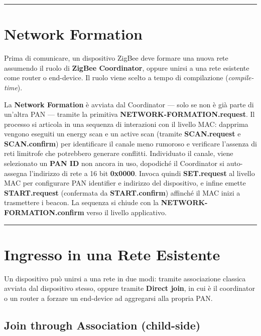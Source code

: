 \documentclass[
  italian,
  openany]{book}
\begin{document}
\begin{center}\rule{0.5\linewidth}{0.5pt}\end{center}

\section{Network Formation}\label{network-formation}

Prima di comunicare, un dispositivo ZigBee deve formare una nuova rete
assumendo il ruolo di \textbf{ZigBee Coordinator}, oppure unirsi a una
rete esistente come router o end-device. Il ruolo viene scelto a tempo
di compilazione (\emph{compile-time}).

La \textbf{Network Formation} è avviata dal Coordinator --- solo se non
è già parte di un'altra PAN --- tramite la primitiva
\textbf{NETWORK-FORMATION.request}. Il processo si articola in una
sequenza di interazioni con il livello MAC: dapprima vengono eseguiti un
energy scan e un active scan (tramite \textbf{SCAN.request} e
\textbf{SCAN.confirm}) per identificare il canale meno rumoroso e
verificare l'assenza di reti limitrofe che potrebbero generare
conflitti. Individuato il canale, viene selezionato un \textbf{PAN ID}
non ancora in uso, dopodiché il Coordinator si auto-assegna l'indirizzo
di rete a 16 bit \textbf{0x0000}. Invoca quindi \textbf{SET.request} al
livello MAC per configurare PAN identifier e indirizzo del dispositivo,
e infine emette \textbf{START.request} (confermata da
\textbf{START.confirm}) affinché il MAC inizi a trasmettere i beacon. La
sequenza si chiude con la \textbf{NETWORK-FORMATION.confirm} verso il
livello applicativo.

\begin{center}\rule{0.5\linewidth}{0.5pt}\end{center}

\section{Ingresso in una Rete
Esistente}\label{ingresso-in-una-rete-esistente}

Un dispositivo può unirsi a una rete in due modi: tramite associazione
classica avviata dal dispositivo stesso, oppure tramite \textbf{Direct
join}, in cui è il coordinator o un router a forzare un end-device ad
aggregarsi alla propria PAN.

\subsection{Join through Association
(child-side)}\label{join-through-association-child-side}
\end{document}
